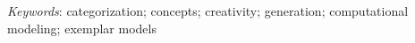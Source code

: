 \documentclass[12pt]{article}
\begin{document}
\setlength\parindent{0.5in}
{\em Keywords}: categorization; concepts; creativity; generation; computational modeling; exemplar models
\clearpage





\end{document}
